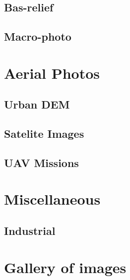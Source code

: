 \subsection{Bas-relief}
\subsection{Macro-photo}


\section{Aerial Photos}

\subsection{Urban DEM}
\subsection{Satelite Images}
\subsection{UAV Missions}


\section{Miscellaneous}
\subsection{Industrial}


\section{Gallery of images}

\newpage





